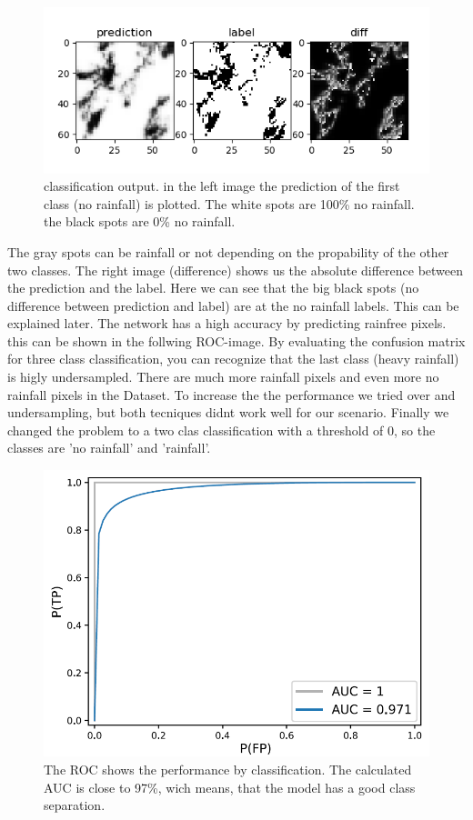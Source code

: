 \documentclass[oneside]{htwg-report}
\begin{document}
\begin{figure}[ht]
\centering
\includegraphics[width=\linewidth]{../pics/categorical_crossentropy_hidden-softmax_output-softmax_above_3072}
\caption{classification output. in the left image the prediction of the first class (no rainfall) is plotted. The white spots are 100\% no rainfall. the black spots are 0\% no rainfall.}
\end{figure}


The gray spots can be rainfall or not depending on the propability of the other two classes. The right image (difference) shows us the absolute difference between the prediction and the label.
Here we can see that the big black spots (no difference between prediction and label) are at the no rainfall labels. This can be explained later. 
The network has a high accuracy by predicting rainfree pixels. this can be shown in the follwing ROC-image. 
By evaluating the confusion matrix for three class classification, you can recognize that the last class (heavy rainfall) is higly undersampled. 
There are much more rainfall pixels and even more no rainfall pixels in the Dataset. To increase the the performance we tried over and undersampling, but both tecniques didnt work well for our scenario.
Finally we changed the problem to a two clas classification with a threshold of 0, so the classes are 'no rainfall' and 'rainfall'.


\begin{figure}[ht]
\centering
\includegraphics[width=\linewidth]{../pics/roc-curve-RESIZED_TXT}
\caption{The ROC shows the performance by classification. The calculated AUC is close to 97\%, wich means, that the model has a good class separation.}
\end{figure}
\end{document}
